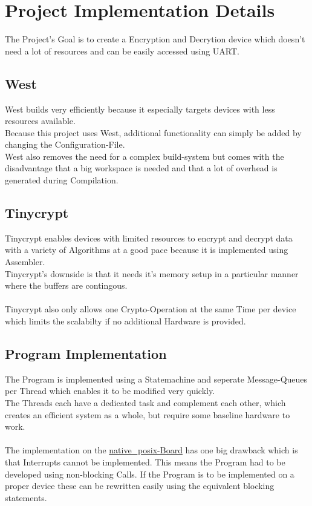\section{Project Implementation Details}

The Project's Goal is to create a Encryption and Decrytion device which
doesn't need a lot of resources and can be easily accessed using UART.

\subsection{West}

West builds very efficiently because it especially targets devices with
less resources available.
\\
Because this project uses West, additional functionality can simply be added
by changing the Configuration-File.
\\
West also removes the need for a complex build-system but comes with the disadvantage
that a big workspace is needed and that a lot of overhead is generated during Compilation.

\subsection{Tinycrypt}

Tinycrypt enables devices with limited resources to encrypt and decrypt data
with a variety of Algorithms at a good pace because it is implemented using
Assembler.
\\
Tinycrypt's downside is that it needs it's memory setup in a particular manner
where the buffers are contingous.
\\
\\
Tinycrypt also only allows one Crypto-Operation at the same Time per device
which limits the scalabilty if no additional Hardware is provided.

\subsection{Program Implementation}

The Program is implemented using a Statemachine and seperate Message-Queues
per Thread which enables it to be modified very quickly.
\\
The Threads each have a dedicated task and complement each other, which creates
an efficient system as a whole, but require some baseline hardware to work.
\\
\\
The implementation on the
\href{https://docs.zephyrproject.org/2.0.0/boards/posix/native_posix/doc/index.html?highlight=native_posix}
{native\_posix-Board} has one big drawback which is that Interrupts cannot be
implemented.
This means the Program had to be developed using non-blocking Calls.
If the Program is to be implemented on a proper device these can be rewritten easily
using the equivalent blocking statements.

